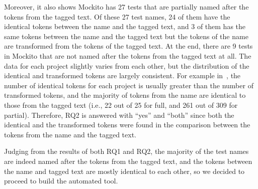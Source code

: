 Moreover, it also shows Mockito has \num{27} tests that are partially named after the tokens from the tagged text.
%
Of these \num{27} test names, \num{24} of them have the identical tokens between the name and the tagged text, and \num{3} of them has the same tokens between the name and the tagged text but the tokens of the name are transformed from the tokens of the tagged text.
%
At the end, there are \num{9} tests in Mockito that are not named after the tokens from the tagged text at all.
%
The data for each project slightly varies from each other, but the distribution of the identical and transformed tokens are largely consistent.
%
For example in~, the number of identical tokens for each project is usually greater than the number of transformed tokens, and the majority of tokens from the name are identical to those from the tagged text (i.e., \num{22} out of \num{25} for full, and \num{261} out of \num{309} for partial).
%
Therefore, RQ2 is answered with \enquote{yes} and \enquote{both} since both the identical and the transformed tokens were found in the comparison between the tokens from the name and the tagged text.

Judging from the results of both RQ1 and RQ2, the majority of the test names are indeed named after the tokens from the tagged text, and the tokens between the name and tagged text are mostly identical to each other, so we decided to proceed to build the automated tool.

